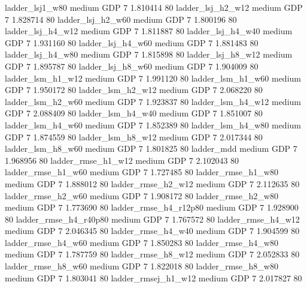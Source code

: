        ladder_lsj1_w80     medium      GDP                 7 1.810414 80
     ladder_lsj_h2_w12     medium      GDP                 7 1.828714 80
     ladder_lsj_h2_w60     medium      GDP                 7 1.800196 80
     ladder_lsj_h4_w12     medium      GDP                 7 1.811887 80
     ladder_lsj_h4_w40     medium      GDP                 7 1.931160 80
     ladder_lsj_h4_w60     medium      GDP                 7 1.881483 80
     ladder_lsj_h4_w80     medium      GDP                 7 1.815898 80
     ladder_lsj_h8_w12     medium      GDP                 7 1.895787 80
     ladder_lsj_h8_w60     medium      GDP                 7 1.904009 80
     ladder_lsm_h1_w12     medium      GDP                 7 1.991120 80
     ladder_lsm_h1_w60     medium      GDP                 7 1.950172 80
     ladder_lsm_h2_w12     medium      GDP                 7 2.068220 80
     ladder_lsm_h2_w60     medium      GDP                 7 1.923837 80
     ladder_lsm_h4_w12     medium      GDP                 7 2.088409 80
     ladder_lsm_h4_w40     medium      GDP                 7 1.851007 80
     ladder_lsm_h4_w60     medium      GDP                 7 1.852389 80
     ladder_lsm_h4_w80     medium      GDP                 7 1.874559 80
     ladder_lsm_h8_w12     medium      GDP                 7 2.017344 80
     ladder_lsm_h8_w60     medium      GDP                 7 1.801825 80
            ladder_mdd     medium      GDP                 7 1.968956 80
    ladder_rmse_h1_w12     medium      GDP                 7 2.102043 80
    ladder_rmse_h1_w60     medium      GDP                 7 1.727485 80
    ladder_rmse_h1_w80     medium      GDP                 7 1.888012 80
    ladder_rmse_h2_w12     medium      GDP                 7 2.112635 80
    ladder_rmse_h2_w60     medium      GDP                 7 1.908172 80
    ladder_rmse_h2_w80     medium      GDP                 7 1.773690 80
 ladder_rmse_h4_r12p80     medium      GDP                 7 1.928900 80
 ladder_rmse_h4_r40p80     medium      GDP                 7 1.767572 80
    ladder_rmse_h4_w12     medium      GDP                 7 2.046345 80
    ladder_rmse_h4_w40     medium      GDP                 7 1.904599 80
    ladder_rmse_h4_w60     medium      GDP                 7 1.850283 80
    ladder_rmse_h4_w80     medium      GDP                 7 1.787759 80
    ladder_rmse_h8_w12     medium      GDP                 7 2.052833 80
    ladder_rmse_h8_w60     medium      GDP                 7 1.822018 80
    ladder_rmse_h8_w80     medium      GDP                 7 1.803041 80
   ladder_rmsej_h1_w12     medium      GDP                 7 2.017827 80
